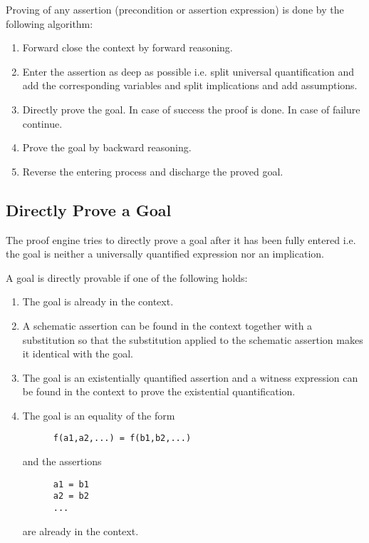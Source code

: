 Proving of any assertion (precondition or assertion expression) is done by
the following algorithm:

\begin{enumerate}
\item Forward close the context by forward reasoning.

\item Enter the assertion as deep as possible i.e. split universal
  quantification and add the corresponding variables and split implications
  and add assumptions.

\item Directly prove the goal. In case of success the proof is done. In case
  of failure continue.

\item Prove the goal by backward reasoning.

\item Reverse the entering process and discharge the proved goal.
\end{enumerate}


\subsection{Directly Prove a Goal}

The proof engine tries to directly prove a goal after it has been fully
entered i.e. the goal is neither a universally quantified expression nor an
implication.

A goal is directly provable if one of the following holds:
\begin{enumerate}
\item The goal is already in the context.

\item A schematic assertion can be found in the context together with a
  substitution so that the substitution applied to the schematic assertion
  makes it identical with the goal.

\item The goal is an existentially quantified assertion and a witness
  expression can be found in the context to prove the existential
  quantification.

\item The goal is an equality of the form
  \begin{lstlisting}
      f(a1,a2,...) = f(b1,b2,...)
  \end{lstlisting}
  and the assertions
  \begin{lstlisting}
      a1 = b1
      a2 = b2
      ...
  \end{lstlisting}
  are already in the context.
\end{enumerate}



